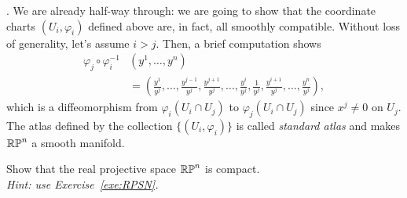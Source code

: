 \begin{example}
	.
	We are already half-way through: we are going to show that the coordinate charts $(U_i, \varphi_i)$ defined above are, in fact, all smoothly compatible.
	Without loss of generality, let's assume $i>j$.
	Then, a brief computation shows
	\begin{align}
		\varphi_j\circ\varphi_i^{-1} & (y^1, \ldots, y^n)                                                                                                                                             \\
		                             & = \left(\frac{y^1}{y^j},\ldots,\frac{y^{j-1}}{y^j},\frac{y^{j+1}}{y^j},\ldots,\frac{y^i}{y^j},\frac1{y^j},\frac{y^{i+1}}{y^j}, \ldots, \frac{y^n}{y^j}\right),
	\end{align}
	which is a diffeomorphism from $\varphi_i(U_i\cap U_j)$ to $\varphi_j(U_i\cap U_j)$ since $x^j\neq 0$ on $U_j$.
	The atlas defined by the collection $\{(U_i, \varphi_i)\}$ is called \emph{standard atlas} and makes $\mathbb{RP}^n$ a smooth manifold.
\end{example}

\begin{exercise}
	Show that the real projective space $\mathbb{RP}^n$ is compact.\\
	\textit{\small Hint: use Exercise~\ref{exe:RPSN}.}
\end{exercise}

